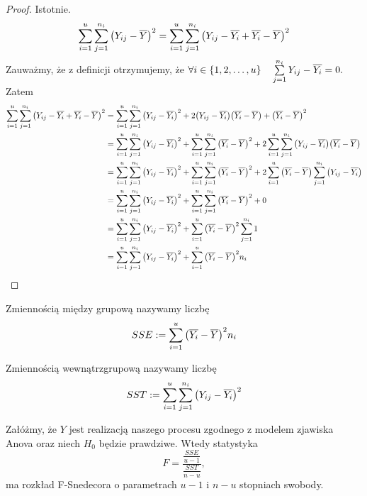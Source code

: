\documentclass[10pt,a4paper]{book}
\begin{document}
\begin{proof}
\tiny
Istotnie. 
$$
\sum_{i=1}^{u} \sum_{j=1}^{n_i} \bracket{Y_{ij} - \mean{Y}}^2 =
\sum_{i=1}^{u} \sum_{j=1}^{n_i} \bracket{Y_{ij} - \mean{Y_i} + 
\mean{Y_i} - \mean{Y}}^2
$$
Zauważmy, że z definicji otrzymujemy, że 
$
\forall i \in \set{1, 2, \ldots, u} \quad \sum_{j=1}^{n_i} Y_{ij} - \mean{Y_i} = 0.
$
Zatem
\begin{align*}
\sum_{i=1}^{u} \sum_{j=1}^{n_i} \bracket{Y_{ij} - \mean{Y_i} + 
\mean{Y_i} - \mean{Y}}^2 & = \sum_{i=1}^{u} \sum_{j=1}^{n_i} \bracket{Y_{ij} - \mean{Y_i}}^2 + 
2 \bracket{Y_{ij} - \mean{Y_i}} \bracket{\mean{Y_i} - \mean{Y}} +
\bracket{\mean{Y_i} - \mean{Y}}^2 \\
& = \sum_{i=1}^{u} \sum_{j=1}^{n_i} \bracket{Y_{ij} - \mean{Y_i}}^2 + 
\sum_{i=1}^{u} \sum_{j=1}^{n_i} \bracket{\mean{Y_i} - \mean{Y}}^2 +
2 \sum_{i=1}^{u} \sum_{j=1}^{n_i} \bracket{Y_{ij} - \mean{Y_i}} \bracket{\mean{Y_i} - \mean{Y}} \\
& = \sum_{i=1}^{u} \sum_{j=1}^{n_i} \bracket{Y_{ij} - \mean{Y_i}}^2 + 
\sum_{i=1}^{u} \sum_{j=1}^{n_i} \bracket{\mean{Y_i} - \mean{Y}}^2 +
2 \sum_{i=1}^{u} \bracket{\mean{Y_i} - \mean{Y}} \sum_{j=1}^{n_i} \bracket{Y_{ij} - \mean{Y_i}}  \\
& = \sum_{i=1}^{u} \sum_{j=1}^{n_i} \bracket{Y_{ij} - \mean{Y_i}}^2 + 
\sum_{i=1}^{u} \sum_{j=1}^{n_i} \bracket{\mean{Y_i} - \mean{Y}}^2 +
0 \\
& = \sum_{i=1}^{u} \sum_{j=1}^{n_i} \bracket{Y_{ij} - \mean{Y_i}}^2 + 
\sum_{i=1}^{u} \bracket{\mean{Y_i} - \mean{Y}}^2 \sum_{j=1}^{n_i} 1  \\
& = \sum_{i=1}^{u} \sum_{j=1}^{n_i} \bracket{Y_{ij} - \mean{Y_i}}^2 + 
\sum_{i=1}^{u} \bracket{\mean{Y_i} - \mean{Y}}^2 n_i 
\end{align*}
\end{proof}

\begin{definition}
Zmiennością między grupową nazywamy liczbę
$$
SSE := \sum_{i=1}^{u} \bracket{\mean{Y_i} - \mean{Y}}^2 n_i 
$$
\end{definition}

\begin{definition}
Zmiennością wewnątrzgrupową nazywamy liczbę
$$
SST := \sum_{i=1}^{u}  \sum_{j=1}^{n_i} \bracket{Y_{ij} - \mean{Y_i}}^2  
$$
\end{definition}

\begin{theorem}
Załóżmy, że $Y$ jest realizacją naszego procesu zgodnego z modelem zjawiska Anova oraz niech $H_0$ będzie prawdziwe. Wtedy statystyka
$$
F = \frac{\frac{SSE}{u-1}}{\frac{SST}{n-u}},
$$
ma rozkład F-Snedecora o parametrach $u-1$ i $n-u$ stopniach swobody.
\end{theorem}
\end{document}
